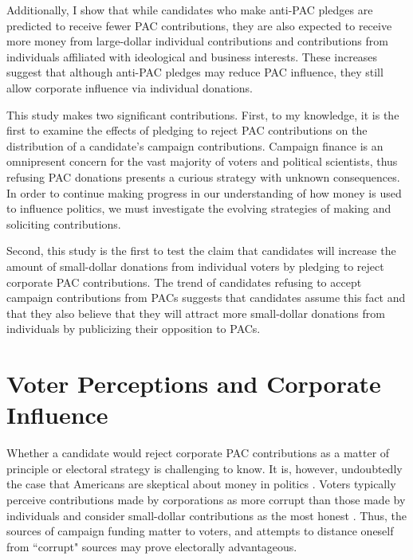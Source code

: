 \documentclass[12pt]{article}
\begin{document}
Additionally, I show that while candidates who make anti-PAC pledges are predicted to receive fewer PAC contributions, they are also expected to receive more money from large-dollar individual contributions and contributions from individuals affiliated with ideological and business interests. These increases suggest that although anti-PAC pledges may reduce PAC influence, they still allow corporate influence via individual donations. 

This study makes two significant contributions. First, to my knowledge, it is the first to examine the effects of pledging to reject PAC contributions on the distribution of a candidate's campaign contributions. Campaign finance is an omnipresent concern for the vast majority of voters and political scientists, thus refusing PAC donations presents a curious strategy with unknown consequences. In order to continue making progress in our understanding of how money is used to influence politics, we must investigate the evolving strategies of making and soliciting contributions.  

Second, this study is the first to test the claim that candidates will increase the amount of small-dollar donations from individual voters by pledging to reject corporate PAC contributions. The trend of candidates refusing to accept campaign contributions from PACs suggests that candidates assume this fact and that they also believe that they will attract more small-dollar donations from individuals by publicizing their opposition to PACs.  


\section{Voter Perceptions and Corporate Influence}

Whether a candidate would reject corporate PAC contributions as a matter of principle or electoral strategy is challenging to know. It is, however, undoubtedly the case that Americans are skeptical about money in politics \citep{lubenow2001}. Voters typically perceive contributions made by corporations as more corrupt than those made by individuals and consider small-dollar contributions as the most honest \citep{bowler2016}. Thus, the sources of campaign funding matter to voters, and attempts to distance oneself from ``corrupt" sources may prove electorally advantageous. 
\end{document}
